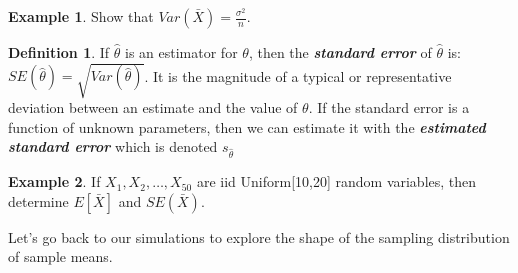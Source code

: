 \documentclass[
  11pt,
  oneside]{book}
\theoremstyle{definition}
\newtheorem{definition}{Definition}[chapter]
\theoremstyle{definition}
\newtheorem{example}{Example}[chapter]
\theoremstyle{definition}
\theoremstyle{definition}
\theoremstyle{remark}
\begin{document}
\begin{example}
Show that \(Var(\bar{X}) = \frac{\sigma^2}{n}\).
\end{example}

\newpage

\begin{definition}
If \(\hat{\theta}\) is an estimator for \(\theta\), then the \textbf{\emph{standard error}} of \(\hat{\theta}\) is: \(SE(\hat{\theta}) = \sqrt{Var(\hat{\theta})}\). It is the magnitude of a typical or representative deviation between an estimate and the value of \(\theta\). If the standard error is a function of unknown parameters, then we can estimate it with the \textbf{\emph{estimated standard error}} which is denoted \(s_{\hat{\theta}}\)
\end{definition}

\begin{example}
If \(X_1, X_2, \ldots, X_{50}\) are iid Uniform{[}10,20{]} random variables, then determine \(E[\bar{X}]\) and \(SE(\bar{X})\).
\end{example}

\vfill \vfill

\newpage

Let's go back to our simulations to explore the shape of the sampling distribution of sample means.

\vspace{0.5cm}
\end{document}

